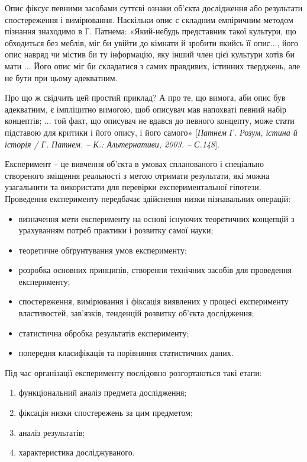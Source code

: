 Опис фіксує певними засобами суттєві ознаки об’єкта дослідження або
результати спостереження і вимірювання. Наскільки опис є складним
емпіричним методом пізнання знаходимо в Г. Патнема: «Який-небудь
представник такої культури, що обходиться без меблів, міг би увійти до
кімнати й зробити якийсь її опис..., його опис навряд чи містив би ту
інформацію, яку інший член цієї культури хотів би мати ... Його опис міг би
складатися з самих правдивих, істинних тверджень, але не бути при цьому
адекватним.

Про що ж свідчить цей простий приклад? А про те, що вимога, аби опис був
адекватним, є імпліцитно вимогою, щоб описувач мав напохваті певний набір
концептів; ... той факт, що описувач не вдався до певного концепту, може стати
підставою для критики і його опису, і його самого» [\textit{Патнем Г. Розум, істина й
історія / Г. Патнем. – К.: Альтернативи, 2003. – С.148}].

Експеримент ‒ це вивчення об’єкта в умовах спланованого і спеціально
створеного зміщення реальності з метою отримати результати, які можна
узагальнити та використати для перевірки експериментальної гіпотези.
Проведення експерименту передбачає здійснення низки пізнавальних операцій:
\begin{itemize}
	\item визначення мети експерименту на основі існуючих теоретичних концепцій
	з урахуванням потреб практики і розвитку самої науки;
	
	\item теоретичне обґрунтування умов експерименту;

	\item розробка основних принципів, створення технічних засобів для
	проведення експерименту;

	\item спостереження, вимірювання і фіксація виявлених у процесі експерименту
	властивостей, зав’язків, тенденцій розвитку об’єкта дослідження;

	\item статистична обробка результатів експерименту;

	\item попередня класифікація та порівняння статистичних даних.
\end{itemize}


Під час організації експерименту послідовно розгортаються такі етапи:
\begin{enumerate}
	\item функціональний аналіз предмета дослідження;
	\item фіксація низки спостережень за цим предметом;
	\item аналіз результатів;
	\item характеристика досліджуваного.
\end{enumerate}

